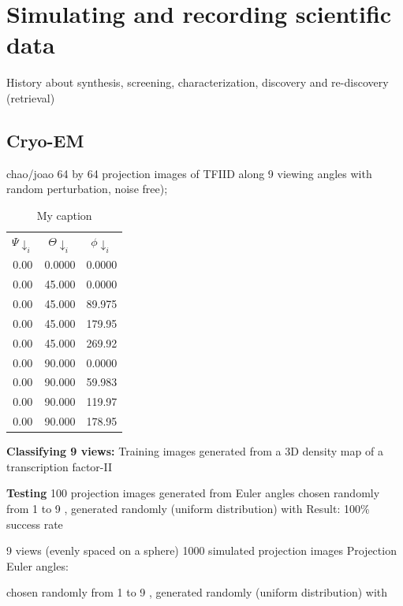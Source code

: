 \section{Simulating and recording scientific data}\label{sec:mat}
History about synthesis, screening, characterization, discovery and re-discovery (retrieval)

\subsection{Cryo-EM}\label{subsec:cryo}
chao/joao
64 by 64 projection images of TFIID along 9 viewing angles with random perturbation, noise free);

\begin{table}[]
\centering
\caption{My caption}
\label{my-label}
\begin{tabular}{|c|c|c|}
 $\Psi\downarrow_i$    & $\Theta\downarrow_i$       & $\phi\downarrow_i$       \\
0.00 & 0.0000 & 0.0000 \\
0.00 & 45.000 & 0.0000 \\
0.00 & 45.000 & 89.975 \\
0.00 & 45.000 & 179.95 \\
0.00 & 45.000 & 269.92 \\
0.00 & 90.000 & 0.0000 \\
0.00 & 90.000 & 59.983 \\
0.00 & 90.000 & 119.97 \\
0.00 & 90.000 & 178.95
\end{tabular}
\end{table}

\textbf{Classifying 9 views:}
Training images generated from a 3D density map of a transcription factor-II

\textbf{Testing}
100 projection images generated from Euler angles
 chosen randomly from 1 to 9
,  generated randomly (uniform distribution) with
Result: 100\% success rate





9 views (evenly spaced on a sphere)
1000 simulated projection images
Projection Euler angles:

 chosen randomly from 1 to 9
,  generated randomly (uniform distribution) with

